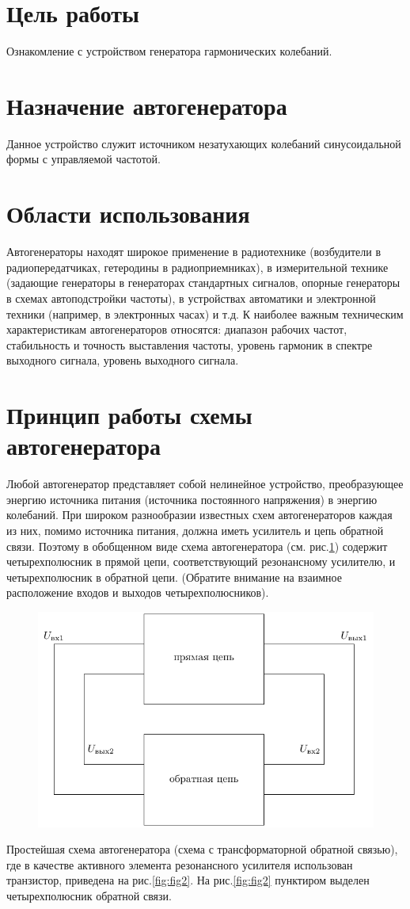 

\newpage

\section{Цель работы}
Ознакомление с устройством генератора гармонических колебаний.

\section{Назначение автогенератора}
Данное устройство служит источником незатухающих колебаний синусоидальной формы с управляемой частотой.

\section{Области использования}
Автогенераторы находят широкое применение в радиотехнике (возбудители в радиопередатчиках, гетеродины в радиоприемниках), в измерительной технике (задающие генераторы в генераторах стандартных сигналов, опорные генераторы в схемах автоподстройки частоты), в устройствах автоматики и электронной техники (например, в электронных часах) и т.д.
К наиболее важным техническим характеристикам автогенераторов относятся: диапазон рабочих частот, стабильность и точность выставления частоты, уровень гармоник в спектре выходного сигнала, уровень выходного сигнала.

\section{Принцип работы схемы автогенератора}
Любой автогенератор представляет собой нелинейное устройство, преобразующее энергию источника питания (источника постоянного напряжения) в энергию колебаний. При широком разнообразии известных схем автогенераторов каждая из них, помимо источника питания, должна иметь усилитель и цепь обратной связи. Поэтому в обобщенном виде схема автогенератора (см. рис.\ref{fig:fig1}) содержит четырехполюсник в прямой цепи, соответствующий резонансному усилителю, и четырехполюсник в обратной цепи. (Обратите внимание на взаимное расположение входов и выходов четырехполюсников).
\begin{figure}[h]
	\centering
	\includegraphics[width=0.5\linewidth]{circuit/one.pdf}
	\caption{}
	\label{fig:fig1}
\end{figure}
Простейшая схема автогенератора (схема с трансформаторной обратной связью), где в качестве активного элемента резонансного усилителя использован транзистор, приведена на рис.\ref{fig:fig2}. На рис.\ref{fig:fig2} пунктиром выделен четырехполюсник обратной связи.

